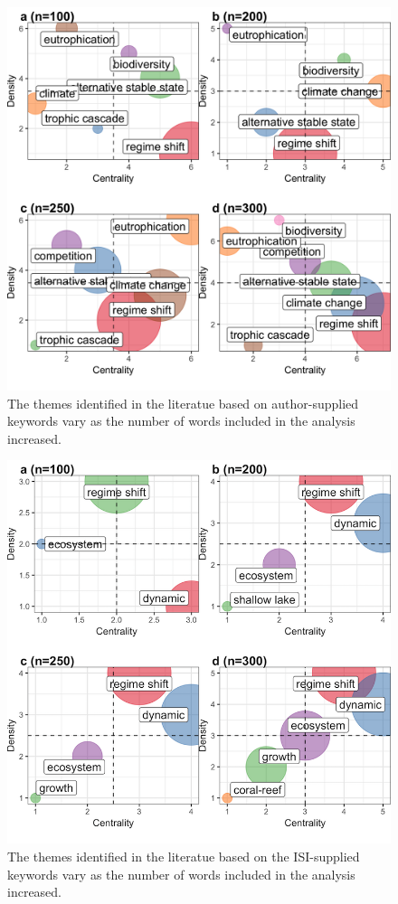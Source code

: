 \documentclass[print]{nuthesis}
\begin{document}
\begin{figure}
\includegraphics[width=0.85\linewidth]{./chapterFiles/rdmReview/figures/figsCalledInDiss/thematicMaps-keywords-nVaries-author} \caption{The themes identified in the literatue based on author-supplied keywords vary as the number of words included in the analysis increased.}\label{fig:thematicMaps-keyword-author}
\end{figure}
\begin{figure}
\includegraphics[width=0.85\linewidth]{./chapterFiles/rdmReview/figures/figsCalledInDiss/thematicMaps-keywords-nVaries-isi} \caption{The themes identified in the literatue based on the ISI-supplied keywords vary as the number of words included in the analysis increased.}\label{fig:thematicMaps-keyword-isi}
\end{figure}
\end{document}
